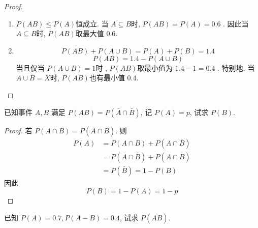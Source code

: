 \documentclass[../main.tex]{subfiles}
\begin{document}
\begin{proof}
    \begin{enumerate}
        \item  \(  P\left( AB \right)\le P\left( A\right)    \)恒成立. 当 \(  A\subseteq B  \)时, \(  P\left( AB \right)= P\left( A \right)= 0.6    \) . 因此当 \(  A\subseteq B  \)时,  \(  P\left( AB \right)   \)取最大值 \(  0.6  \).
        \item  \[
        P\left( AB \right)+ P\left( A\cup B \right)= P\left( A \right)+ P\left( B \right)=1.4  
        \]    \[
        P\left( AB \right)= 1.4- P\left( A\cup B \right)  
        \]当且仅当  \(  P\left( A\cup B \right) = 1\)时 , \(  P\left( AB \right)   \)取最小值为 \(  1.4-1  = 0.4\)   . 特别地, 当 \(  A\cup B= X  \)时, \(  P\left( AB \right)   \)也有最小值 \(  0.4  \).   
    \end{enumerate}
    
\end{proof}
\begin{exercise}{}{}
已知事件 $A, B$ 满足 $P(AB) = P(\bar{A} \cap \bar{B})$, 记 $P(A) = p$, 试求 $P(B)$.
\end{exercise}

\begin{proof}
    若 \(  P\left( A\cap B \right)= P\left( \bar{A}\cap \bar{B} \right)    \). 则 \[
  \begin{aligned}
  P\left( A \right)&= P\left( A\cap B \right)+ P\left( A\cap \bar{B} \right)\\ 
   &= P\left( \bar{A}\cap \bar{B} \right)+ P\left( A\cap \bar{B} \right)\\ 
    &= P\left( \bar{B}\right)      = 1-P\left( B \right)  
  \end{aligned}
    \] 因此 \[
    P\left( B \right)= 1-P\left( A \right)= 1-p  
    \]
\end{proof}
\begin{exercise}{}{}
已知 $P(A) = 0.7, P(A-B) = 0.4$, 试求 $P(\overline{AB})$.
\end{exercise}
\end{document}
